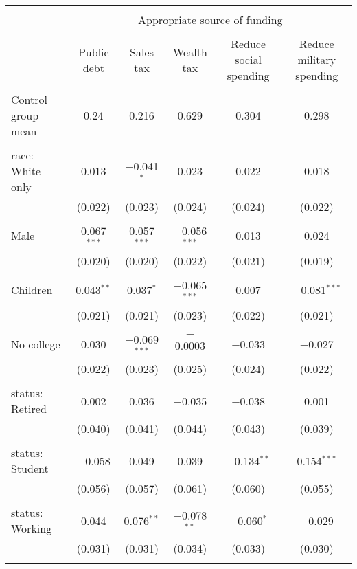 
\begin{tabular}{@{\extracolsep{5pt}}lccccc} 
\\[-1.8ex]\hline 
\hline \\[-1.8ex] 
 & \multicolumn{5}{c}{Appropriate source of funding} \\ 
\cline{2-6} 
\\[-1.8ex] & Public debt & Sales tax & Wealth tax & Reduce social spending & Reduce military spending \\ 
\hline \\[-1.8ex] 
 Control group mean & 0.24 & 0.216 & 0.629 & 0.304 & 0.298  \\ \hline \\[-1.8ex] race: White only & 0.013 & $-$0.041$^{*}$ & 0.023 & 0.022 & 0.018 \\ 
  & (0.022) & (0.023) & (0.024) & (0.024) & (0.022) \\ 
  & & & & & \\ 
 Male & 0.067$^{***}$ & 0.057$^{***}$ & $-$0.056$^{***}$ & 0.013 & 0.024 \\ 
  & (0.020) & (0.020) & (0.022) & (0.021) & (0.019) \\ 
  & & & & & \\ 
 Children & 0.043$^{**}$ & 0.037$^{*}$ & $-$0.065$^{***}$ & 0.007 & $-$0.081$^{***}$ \\ 
  & (0.021) & (0.021) & (0.023) & (0.022) & (0.021) \\ 
  & & & & & \\ 
 No college & 0.030 & $-$0.069$^{***}$ & $-$0.0003 & $-$0.033 & $-$0.027 \\ 
  & (0.022) & (0.023) & (0.025) & (0.024) & (0.022) \\ 
  & & & & & \\ 
 status: Retired & 0.002 & 0.036 & $-$0.035 & $-$0.038 & 0.001 \\ 
  & (0.040) & (0.041) & (0.044) & (0.043) & (0.039) \\ 
  & & & & & \\ 
 status: Student & $-$0.058 & 0.049 & 0.039 & $-$0.134$^{**}$ & 0.154$^{***}$ \\ 
  & (0.056) & (0.057) & (0.061) & (0.060) & (0.055) \\ 
  & & & & & \\ 
 status: Working & 0.044 & 0.076$^{**}$ & $-$0.078$^{**}$ & $-$0.060$^{*}$ & $-$0.029 \\ 
  & (0.031) & (0.031) & (0.034) & (0.033) & (0.030) \\ 
  & & & & & \\ 

\end{tabular}
